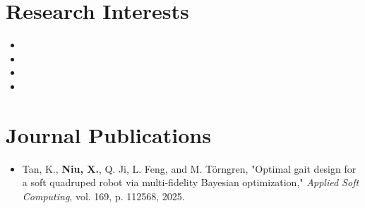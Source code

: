 \documentclass[a4paper,11pt]{article}
\newcommand{\resumeSubHeadingListStart}{\begin{itemize}[leftmargin=*,labelsep=0mm]}
\newcommand{\resumeSubHeadingListEnd}{\end{itemize}\vspace{2mm}}
\begin{document}
\section{\textbf{Research Interests}}
\vspace{-2.5mm}
\begin{multicols}{2}
  \resumeSubHeadingListStart
    \item \hspace{0.5em}{Cyber-Physical Systems}
    \item \hspace{0.5em}{Reinforcement Learning}
    \item \hspace{0.5em}{Control \& Dynamics}
    \item \hspace{0.5em}{Heterogeneous Robots Collaboration}
  \resumeSubHeadingListEnd
\vspace{-5.5mm}
\end{multicols}

\section{\textbf{Journal Publications}}
\resumeSubHeadingListStart
  \vspace{3mm}
  \item \hspace{0.3mm} Tan, K., \textbf{Niu, X.}, Q. Ji, L. Feng, and M. Törngren, "Optimal gait design for a soft quadruped robot via multi-fidelity Bayesian optimization," \textit{Applied Soft Computing}, vol. 169, p. 112568, 2025.
  
\resumeSubHeadingListEnd
\vspace{-5.5mm}

\end{document}
